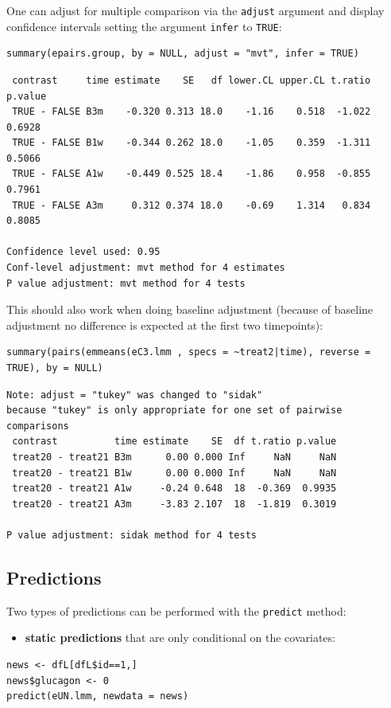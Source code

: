 \documentclass[12pt]{article}
\begin{document}
One can adjust for multiple comparison via the \texttt{adjust} argument and
display confidence intervals setting the argument \texttt{infer} to \texttt{TRUE}:
\lstset{language=r,label= ,caption= ,captionpos=b,numbers=none}
\begin{lstlisting}
summary(epairs.group, by = NULL, adjust = "mvt", infer = TRUE)
\end{lstlisting}

\begin{verbatim}
 contrast     time estimate    SE   df lower.CL upper.CL t.ratio p.value
 TRUE - FALSE B3m    -0.320 0.313 18.0    -1.16    0.518  -1.022  0.6928
 TRUE - FALSE B1w    -0.344 0.262 18.0    -1.05    0.359  -1.311  0.5066
 TRUE - FALSE A1w    -0.449 0.525 18.4    -1.86    0.958  -0.855  0.7961
 TRUE - FALSE A3m     0.312 0.374 18.0    -0.69    1.314   0.834  0.8085

Confidence level used: 0.95 
Conf-level adjustment: mvt method for 4 estimates 
P value adjustment: mvt method for 4 tests
\end{verbatim}


This should also work when doing baseline adjustment (because of
baseline adjustment no difference is expected at the first two
timepoints):
\lstset{language=r,label= ,caption= ,captionpos=b,numbers=none}
\begin{lstlisting}
summary(pairs(emmeans(eC3.lmm , specs = ~treat2|time), reverse = TRUE), by = NULL)
\end{lstlisting}

\begin{verbatim}
Note: adjust = "tukey" was changed to "sidak"
because "tukey" is only appropriate for one set of pairwise comparisons
 contrast          time estimate    SE  df t.ratio p.value
 treat20 - treat21 B3m      0.00 0.000 Inf     NaN     NaN
 treat20 - treat21 B1w      0.00 0.000 Inf     NaN     NaN
 treat20 - treat21 A1w     -0.24 0.648  18  -0.369  0.9935
 treat20 - treat21 A3m     -3.83 2.107  18  -1.819  0.3019

P value adjustment: sidak method for 4 tests
\end{verbatim}


\clearpage

\subsection{Predictions}
\label{sec:org96eff1e}

Two types of predictions can be performed with the \texttt{predict} method:
\begin{itemize}
\item \textbf{static predictions} that are only conditional on the covariates:
\end{itemize}
\lstset{language=r,label= ,caption= ,captionpos=b,numbers=none}
\begin{lstlisting}
news <- dfL[dfL$id==1,]
news$glucagon <- 0
predict(eUN.lmm, newdata = news)
\end{lstlisting}
\end{document}

